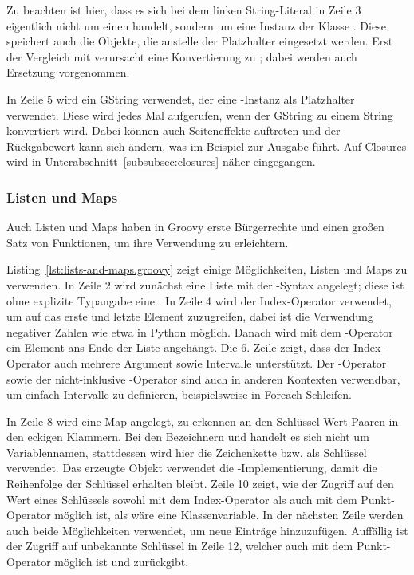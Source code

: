	Zu beachten ist hier, dass es sich bei dem linken String-Literal in Zeile 3 eigentlich nicht um einen  handelt, sondern um eine Instanz der Klasse .
	Diese speichert auch die Objekte, die anstelle der Platzhalter eingesetzt werden.
	Erst der Vergleich mit \code{==} verursacht eine Konvertierung zu ; dabei werden auch Ersetzung vorgenommen.

	In Zeile 5 wird ein GString verwendet, der eine -Instanz als Platzhalter verwendet.
	Diese wird jedes Mal aufgerufen, wenn der GString zu einem String konvertiert wird.
	Dabei können auch Seiteneffekte auftreten und der Rückgabewert kann sich ändern, was im Beispiel zur Ausgabe  führt.
	Auf Closures wird in Unterabschnitt~\ref{subsubsec:closures} näher eingegangen.

	\subsubsection{Listen und Maps}

	Auch Listen und Maps haben in Groovy erste Bürgerrechte und einen großen Satz von Funktionen, um ihre Verwendung zu erleichtern.


	Listing~\ref{lst:lists-and-maps.groovy} zeigt einige Möglichkeiten, Listen und Maps zu verwenden.
	In Zeile 2 wird zunächst eine Liste mit der \code{[]}-Syntax angelegt;
	diese ist ohne explizite Typangabe eine .
	In Zeile 4 wird der Index-Operator verwendet, um auf das erste und letzte Element zuzugreifen, dabei ist die Verwendung negativer Zahlen wie etwa in Python möglich.
	Danach wird mit dem \code{<<}-Operator ein Element ans Ende der Liste angehängt.
	Die 6. Zeile zeigt, dass der Index-Operator auch mehrere Argument sowie Intervalle unterstützt.
	Der -Operator sowie der nicht-inklusive -Operator sind auch in anderen Kontexten verwendbar, um einfach Intervalle zu definieren, beispielsweise in Foreach-Schleifen.

	In Zeile 8 wird eine Map angelegt, zu erkennen an den Schlüssel-Wert-Paaren in den eckigen Klammern.
	Bei den Bezeichnern  und  handelt es sich nicht um Variablennamen, stattdessen wird hier die Zeichenkette  bzw.  als Schlüssel verwendet.
	Das erzeugte Objekt verwendet die -Implementierung, damit die Reihenfolge der Schlüssel erhalten bleibt.
	Zeile 10 zeigt, wie der Zugriff auf den Wert eines Schlüssels sowohl mit dem Index-Operator als auch mit dem Punkt-Operator möglich ist, als wäre  eine Klassenvariable.
	In der nächsten Zeile werden auch beide Möglichkeiten verwendet, um neue Einträge hinzuzufügen.
	Auffällig ist der Zugriff auf unbekannte Schlüssel in Zeile 12, welcher auch mit dem Punkt-Operator möglich ist und  zurückgibt.


